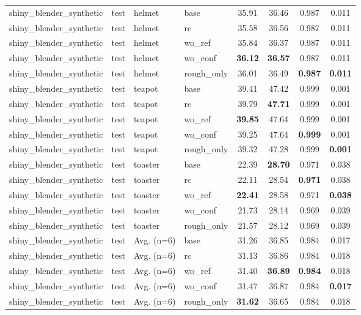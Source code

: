\begin{table}[t]
{\begin{tabular}{llllcccc}
shiny\_blender\_synthetic & test & helmet & base & 35.91 & 36.46 & 0.987 & 0.011 \\
shiny\_blender\_synthetic & test & helmet & rc & 35.58 & 36.56 & 0.987 & 0.011 \\
shiny\_blender\_synthetic & test & helmet & wo\_ref & 35.84 & 36.37 & 0.987 & 0.011 \\
shiny\_blender\_synthetic & test & helmet & wo\_conf & \textbf{36.12} & \textbf{36.57} & 0.987 & 0.011 \\
shiny\_blender\_synthetic & test & helmet & rough\_only & 36.01 & 36.49 & \textbf{0.987} & \textbf{0.011} \\
shiny\_blender\_synthetic & test & teapot & base & 39.41 & 47.42 & 0.999 & 0.001 \\
shiny\_blender\_synthetic & test & teapot & rc & 39.79 & \textbf{47.71} & 0.999 & 0.001 \\
shiny\_blender\_synthetic & test & teapot & wo\_ref & \textbf{39.85} & 47.64 & 0.999 & 0.001 \\
shiny\_blender\_synthetic & test & teapot & wo\_conf & 39.25 & 47.64 & \textbf{0.999} & 0.001 \\
shiny\_blender\_synthetic & test & teapot & rough\_only & 39.32 & 47.28 & 0.999 & \textbf{0.001} \\
shiny\_blender\_synthetic & test & toaster & base & 22.39 & \textbf{28.70} & 0.971 & 0.038 \\
shiny\_blender\_synthetic & test & toaster & rc & 22.11 & 28.54 & \textbf{0.971} & 0.038 \\
shiny\_blender\_synthetic & test & toaster & wo\_ref & \textbf{22.41} & 28.58 & 0.971 & \textbf{0.038} \\
shiny\_blender\_synthetic & test & toaster & wo\_conf & 21.73 & 28.14 & 0.969 & 0.039 \\
shiny\_blender\_synthetic & test & toaster & rough\_only & 21.57 & 28.12 & 0.969 & 0.039 \\
shiny\_blender\_synthetic & test & Avg. (n=6) & base & 31.26 & 36.85 & 0.984 & 0.017 \\
shiny\_blender\_synthetic & test & Avg. (n=6) & rc & 31.13 & 36.86 & 0.984 & 0.018 \\
shiny\_blender\_synthetic & test & Avg. (n=6) & wo\_ref & 31.40 & \textbf{36.89} & \textbf{0.984} & 0.018 \\
shiny\_blender\_synthetic & test & Avg. (n=6) & wo\_conf & 31.47 & 36.87 & 0.984 & \textbf{0.017} \\
shiny\_blender\_synthetic & test & Avg. (n=6) & rough\_only & \textbf{31.62} & 36.65 & 0.984 & 0.018 \\
\bottomrule
\end{tabular}}
\end{table}

